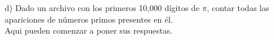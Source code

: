 \newpage
\Large
d) Dado un archivo con los primeros 10,000 dígitos de $\pi$, contar todas las apariciones de números primos presentes en él.\\
\newline
\large
Aqui pueden comenzar a poner sus respuestas.